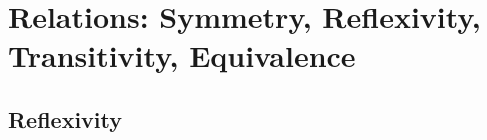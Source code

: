 \chapter{Relations: Symmetry, Reflexivity, Transitivity, Equivalence}
\label{chap:Relations}

\section{Reflexivity}
\label{sec:Reflexivity}